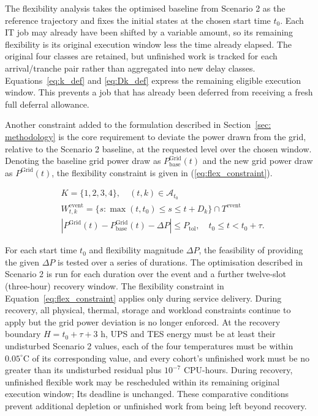 \documentclass[lettersize,journal]{IEEEtran}
\newcommand{\rev}[1]{#1}
\begin{document}
The flexibility analysis takes the optimised baseline from Scenario 2 as the reference trajectory and fixes the initial states at the chosen start time $t_0$. Each IT job may already have been shifted by a variable amount, so its remaining flexibility is its original execution window less the time already elapsed. The original four classes are retained, but unfinished work is tracked for each arrival/tranche pair rather than aggregated into new delay classes. Equations~\eqref{eq:k_def} and \eqref{eq:Dk_def} express the remaining eligible execution window. This prevents a job that has already been deferred from receiving a fresh full deferral allowance.

Another constraint added to the formulation described in Section~\ref{sec: methodology} is the core requirement to deviate the power drawn from the grid, relative to the Scenario 2 baseline, at the requested level over the chosen window. Denoting the baseline grid power draw as $P^{\mathrm{Grid}}_{\mathrm{base}}(t)$ and the new grid power draw as $P^{\mathrm{Grid}}(t)$, the flexibility constraint is given in (\ref{eq:flex_constraint}).

\begin{align}
& K=\{1,2,3,4\},\quad (t,k)\in\mathcal A_{t_0} \label{eq:k_def} \\
& W^{\mathrm{event}}_{t,k}=\{s:\max(t,t_0)\leq s\leq t+D_k\}\cap T^{\mathrm{event}} \label{eq:Dk_def} \\
& \left|P^{\mathrm{Grid}}(t)-P^{\mathrm{Grid}}_{\mathrm{base}}(t)-\Delta P\right|\leq P_{\mathrm{tol}},\quad t_0\leq t<t_0+\tau. \label{eq:flex_constraint}
\end{align}

For each start time $t_0$ and flexibility magnitude $\Delta P$, the feasibility of providing the given $\Delta P$ is tested over a series of durations. \rev{The optimisation described in Scenario 2 is run for each duration over the event and a further twelve-slot (three-hour) recovery window. The flexibility constraint in Equation~\eqref{eq:flex_constraint} applies only during service delivery. During recovery, all physical, thermal, storage and workload constraints continue to apply but the grid power deviation is no longer enforced.} At the recovery boundary $H=t_0+\tau+3$ h, UPS and TES energy must be at least their undisturbed Scenario 2 values, each of the four temperatures must be within $0.05^\circ$C of its corresponding value, and every cohort's unfinished work must be no greater than its undisturbed residual plus $10^{-7}$ CPU-hours. During recovery, unfinished flexible work may be rescheduled within its remaining original execution window; Its deadline is unchanged. These comparative conditions prevent additional depletion or unfinished work from being left beyond recovery.
\end{document}
